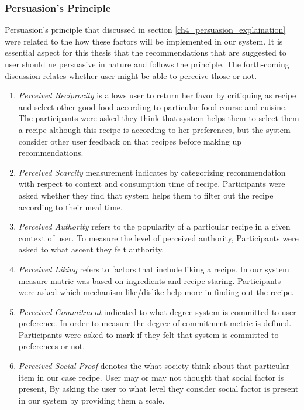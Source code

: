 \subsubsection{Persuasion’s Principle}
Persuasion’s principle that discussed in section \ref{ch4_persuasion_explaination} were related to the how these factors will be implemented in our system.  It is essential aspect for this thesis that the recommendations that are suggested to user should ne persuasive in nature and follows the principle. The forth-coming discussion relates whether user might be able to perceive those or not.
  \begin{enumerate}
  	\item \textit{Perceived Reciprocity} is allows user to return her favor by critiquing as recipe and select other good food according to particular food course and cuisine. The participants were asked they think that system helps them to select them a recipe although this recipe is according to her preferences, but the system consider other user feedback on that recipes before making up recommendations.
  	
  	\item \textit{Perceived Scarcity} measurement indicates by categorizing recommendation with respect to context and consumption time of recipe. Participants were asked whether they find that system helps them to filter out the recipe according to their meal time.      
  	\item \textit{Perceived Authority} refers to the popularity of a particular recipe in a given context of user. To measure the level of perceived authority, Participants were asked to what ascent they felt authority. 
  	
  	\item \textit{Perceived Liking} refers to factors that include liking a recipe. In our system measure matric was based on ingredients and recipe staring. Participants were asked which mechanism like/dislike help more in finding out the recipe. 	  
  	
  	\item \textit{Perceived Commitment} indicated to what degree system is committed to user preference. In order to measure the degree of commitment metric is defined. Participants were asked to mark if they felt that system is committed to preferences or not.	  
  	  	
  	\item \textit{Perceived Social Proof} denotes the what society think about that particular item in our case recipe. User may or may not thought that social factor is present, By asking the user to what level they consider social factor is present in our system by providing them a scale.   
  \end{enumerate}
  

